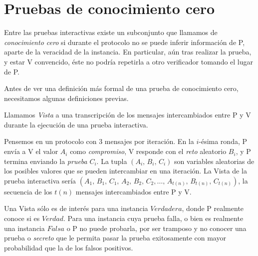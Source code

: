 \section{Pruebas de conocimiento cero}




Entre las pruebas interactivas existe un subconjunto que llamamos de \textit{conocimiento cero} si durante el protocolo no se puede inferir información de P, aparte de la veracidad de la instancia. En particular, aún tras realizar la prueba, y estar V convencido, éste no podría repetirla a otro verificador tomando el lugar de P.

\hfil

Antes de ver una definición más formal de una prueba de conocimiento cero, necesitamos algunas definiciones previas.



\begin{definition}
	Llamamos \textit{Vista} a una transcripción de los mensajes intercambiados entre P y V durante la ejecución de una prueba interactiva.
\end{definition}


Pensemos en un protocolo con 3 mensajes por iteración. En la $i$-ésima ronda, P envía a V el valor $A_i$ como \textit{compromiso}, V responde con el \textit{reto} aleatorio $B_i$, y P termina enviando la \textit{prueba} $C_i$. La tupla $(A_i,\,B_i,\,C_i)$ son variables aleatorias de los posibles valores que se pueden intercambiar en una iteración. La Vista de la prueba interactiva sería $(A_1,\,B_1,\,C_1,\,A_2,\,B_2,\,C_2,\dots ,\,A_{t(n)},\,B_{t(n)},\,C_{t(n)})$, la secuencia de los $t(n)$ mensajes intercambiados entre P y V.

Una Vista sólo es de interés para una instancia $Verdadera$, donde P realmente conoce si es $Verdad$. Para una instancia cuya prueba falla, o bien es realmente una instancia $Falsa$ o P no puede probarla, por ser tramposo y no conocer una prueba o \textit{secreto} que le permita pasar la prueba exitosamente con mayor probabilidad que la de los falsos positivos.


